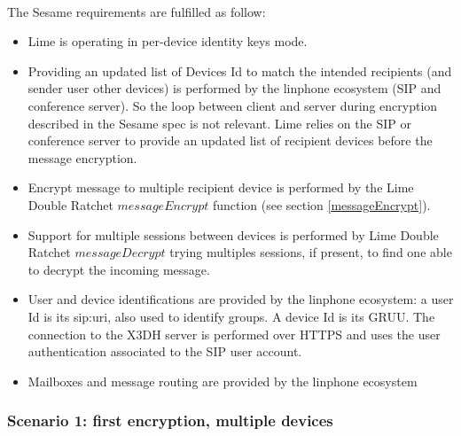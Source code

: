 \documentclass[a4paper,11pt]{article}
\begin{document}
    \paragraph{}The Sesame requirements are fulfilled as follow:
    \begin{itemize}
      \item Lime is operating in per-device identity keys mode.
      \item Providing an updated list of Devices Id to match the intended recipients (and sender user other devices) is performed by the linphone ecosystem (SIP and conference server). So the loop between client and server during encryption described in the Sesame spec\cite{sesame} is not relevant. Lime relies on the SIP or conference server to provide an updated list of recipient devices before the message encryption.
      \item Encrypt message to multiple recipient device is performed by the Lime Double Ratchet $messageEncrypt$ function (see section \ref{messageEncrypt}).
      \item Support for multiple sessions between devices is performed by Lime Double Ratchet $messageDecrypt$ trying multiples sessions, if present, to find one able to decrypt the incoming message.
      \item User and device identifications are provided by the linphone ecosystem: a user Id is its sip:uri, also used to identify groups. A device Id is its GRUU\cite{rfc5627}. The connection to the X3DH server is performed over HTTPS and uses the user authentication associated to the SIP user account.
      \item Mailboxes and message routing are provided by the linphone ecosystem
    \end{itemize}
   
    \newpage
    \subsubsection{Scenario 1: first encryption, multiple devices}
\end{document}
